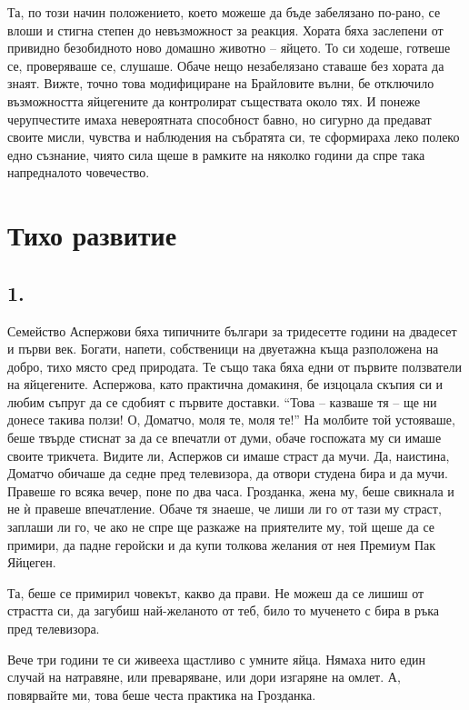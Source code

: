 \documentclass[ebook,openany,12pt]{memoir}
\begin{document}
Та, по този начин положението, което можеше да бъде забелязано по-рано, се влоши и стигна степен до невъзможност за реакция. Хората бяха заслепени от привидно безобидното ново домашно животно – яйцето. То си ходеше, готвеше се, проверяваше се, слушаше. Обаче нещо незабелязано ставаше без хората да знаят. Вижте, точно това модифициране на Брайловите вълни, бе отключило възможността яйцегените да контролират съществата около тях. И понеже черупчестите имаха невероятната способност бавно, но сигурно да предават своите мисли, чувства и наблюдения на събратята си, те сформираха леко полеко едно съзнание, чиято сила щеше в рамките на няколко години да спре така напредналото човечество. 

\chapter{Тихо развитие}

\section*{1.}

Семейство Аспержови бяха типичните българи за тр\-идесетте години на двадесет и първи век. Богати, напети, собственици на двуетажна къща разположена на добро, тихо място сред природата. Те също така бяха едни от първите ползватели на яйцегените. Аспержова, като практична домакиня, бе изцоцала скъпия си и любим съпруг да се сдобият с първите доставки. ``Това -- казваше тя -- ще ни донесе такива ползи! О, Доматчо, моля те, моля те!'' На молбите той устояваше, беше твърде стиснат за да се впечатли от думи, обаче госпожата му си имаше своите трикчета. Видите ли, Аспержов си имаше страст да мучи. Да, наистина, Доматчо обичаше да седне пред телевизора, да отвори студена бира и да мучи. Правеше го всяка вечер, поне по два часа. Грозданка, жена му, беше свикнала и не ѝ правеше впечатление. Обаче тя знаеше, че лиши ли го от тази му страст, заплаши ли го, че ако не спре ще разкаже на приятелите му, той щеше да се примири, да падне геройски и да купи толкова желания от нея Премиум Пак Яйцеген.

Та, беше се примирил човекът, какво да прави. Не можеш да се лишиш от страстта си, да загубиш най-желаното от теб, било то мученето с бира в ръка пред телевизора. 

Вече три години те си живееха щастливо с умните яйца. Нямаха нито един случай на натравяне, или преваряване, или дори изгаряне на омлет. А, повярвайте ми, това беше честа практика на Грозданка. 
\end{document}

